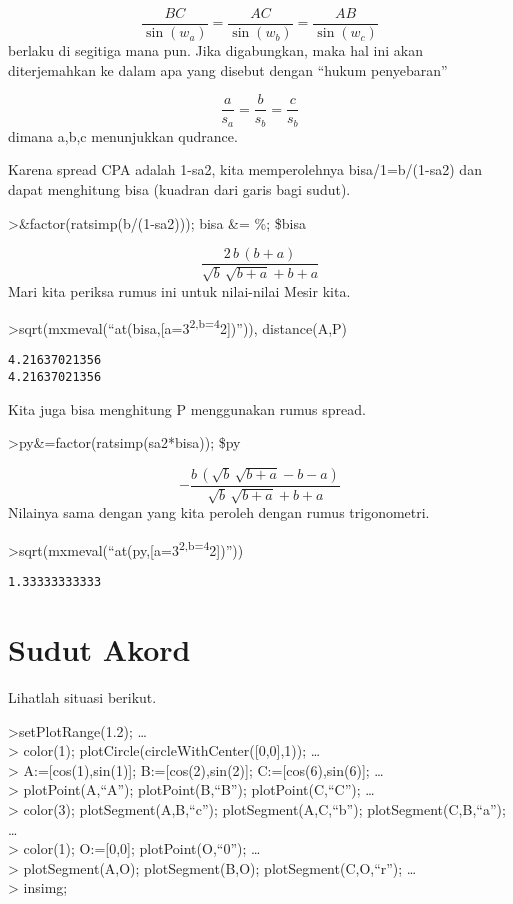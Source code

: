 \documentclass[
]{book}
\begin{document}
\[\frac{BC}{\sin(w_a)} = \frac{AC}{\sin(w_b)} = \frac{AB}{\sin(w_c)}\]berlaku di segitiga mana pun. Jika digabungkan, maka hal ini akan diterjemahkan ke dalam apa yang disebut dengan ``hukum penyebaran''

\[\frac{a}{s_a} = \frac{b}{s_b} = \frac{c}{s_b}\]dimana a,b,c menunjukkan qudrance.

Karena spread CPA adalah 1-sa2, kita memperolehnya bisa/1=b/(1-sa2) dan dapat menghitung bisa (kuadran dari garis bagi sudut).

\textgreater\&factor(ratsimp(b/(1-sa2))); bisa \&= \%; \$bisa

\[\frac{2\,b\,\left(b+a\right)}{\sqrt{b}\,\sqrt{b+a}+b+a}\]Mari kita periksa rumus ini untuk nilai-nilai Mesir kita.

\textgreater sqrt(mxmeval(``at(bisa,{[}a=3\textsuperscript{2,b=4}2{]})'')), distance(A,P)

\begin{verbatim}
4.21637021356
4.21637021356
\end{verbatim}

Kita juga bisa menghitung P menggunakan rumus spread.

\textgreater py\&=factor(ratsimp(sa2*bisa)); \$py

\[-\frac{b\,\left(\sqrt{b}\,\sqrt{b+a}-b-a\right)}{\sqrt{b}\,\sqrt{b+  a}+b+a}\]Nilainya sama dengan yang kita peroleh dengan rumus trigonometri.

\textgreater sqrt(mxmeval(``at(py,{[}a=3\textsuperscript{2,b=4}2{]})''))

\begin{verbatim}
1.33333333333
\end{verbatim}

\section{Sudut Akord}\label{sudut-akord}

Lihatlah situasi berikut.

\textgreater setPlotRange(1.2); \ldots{}\\
\textgreater{} color(1); plotCircle(circleWithCenter({[}0,0{]},1)); \ldots{}\\
\textgreater{} A:={[}cos(1),sin(1){]}; B:={[}cos(2),sin(2){]}; C:={[}cos(6),sin(6){]}; \ldots{}\\
\textgreater{} plotPoint(A,``A''); plotPoint(B,``B''); plotPoint(C,``C''); \ldots{}\\
\textgreater{} color(3); plotSegment(A,B,``c''); plotSegment(A,C,``b''); plotSegment(C,B,``a''); \ldots{}\\
\textgreater{} color(1); O:={[}0,0{]}; plotPoint(O,``0''); \ldots{}\\
\textgreater{} plotSegment(A,O); plotSegment(B,O); plotSegment(C,O,``r''); \ldots{}\\
\textgreater{} insimg;
\end{document}
